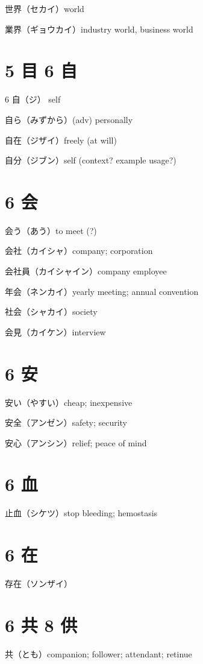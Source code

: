 世界（セカイ）world

業界（ギョウカイ）industry world, business world

\section{5 目 6 自}

6 自（ジ） self

自ら（みずから）(adv) personally

自在（ジザイ）freely (at will)

自分（ジブン）self (context? example usage?)

\section{6 会}

会う（あう）to meet (?)

会社（カイシャ）company; corporation

会社員（カイシャイン）company employee

年会（ネンカイ）yearly meeting; annual convention

社会（シャカイ）society

会見（カイケン）interview

\section{6 安}

安い（やすい）cheap; inexpensive

安全（アンゼン）safety; security

安心（アンシン）relief; peace of mind

\section{6 血}

止血（シケツ）stop bleeding; hemostasis

\section{6 在}

存在（ソンザイ）

\section{6 共 8 供}

共（とも）companion; follower; attendant; retinue

